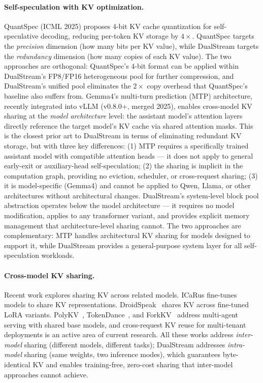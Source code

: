 \documentclass[review]{elsarticle}
\theoremstyle{definition}
\theoremstyle{remark}
\begin{document}
\paragraph{Self-speculation with KV optimization.}
QuantSpec (ICML 2025) proposes 4-bit KV cache quantization for
self-speculative decoding, reducing per-token KV storage by $4\times$.
QuantSpec targets the \emph{precision} dimension (how many bits per KV
value), while DualStream targets the \emph{redundancy} dimension
(how many copies of each KV value). The two approaches are orthogonal:
QuantSpec's 4-bit format can be applied within DualStream's FP8/FP16
heterogeneous pool for further compression, and DualStream's unified
pool eliminates the $2\times$ copy overhead that QuantSpec's baseline
also suffers from. Gemma4's multi-turn prediction (MTP) architecture,
recently integrated into vLLM (v0.8.0+, merged 2025), enables cross-model
KV sharing at the \emph{model architecture} level: the assistant model's
attention layers directly reference the target model's KV cache via
shared attention masks. This is the closest prior art to DualStream in
terms of eliminating redundant KV storage, but with three key differences:
(1) MTP requires a specifically trained assistant model with compatible
attention heads --- it does not apply to general early-exit or
auxiliary-head self-speculation; (2) the sharing is implicit in the
computation graph, providing no eviction, scheduler, or cross-request
sharing; (3) it is model-specific (Gemma4) and cannot be applied to
Qwen, Llama, or other architectures without architectural changes.
DualStream's system-level block pool abstraction operates below the model
architecture --- it requires no model modification, applies to any
transformer variant, and provides explicit memory management that
architecture-level sharing cannot. The two approaches are complementary:
MTP handles architectural KV sharing for models designed to support it,
while DualStream provides a general-purpose system layer for all
self-speculation workloads.

\paragraph{Cross-model KV sharing.}
Recent work explores sharing KV across related models. ICaRus
\cite{icarus2026} fine-tunes models to share KV representations.
DroidSpeak~\cite{droidspeak2026} shares KV across fine-tuned LoRA
variants. PolyKV~\cite{polykv2026}, TokenDance~\cite{tokendance2026},
and ForkKV~\cite{forkkv2026} address multi-agent serving with shared
base models, and cross-request KV reuse for multi-tenant deployments
is an active area of current research. All these works address \emph{inter-model}
sharing (different models, different tasks); DualStream addresses
\emph{intra-model} sharing (same weights, two inference modes), which
guarantees byte-identical KV and enables training-free, zero-cost
sharing that inter-model approaches cannot achieve.
\end{document}
